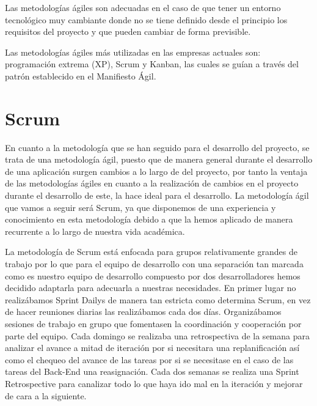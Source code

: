 Las metodologías ágiles son adecuadas en el caso de que tener un entorno tecnológico muy cambiante donde no se tiene definido desde el principio los requisitos del proyecto y que pueden cambiar de forma previsible.

Las metodologías ágiles más utilizadas en las empresas actuales son: programación extrema (XP), Scrum y Kanban, las cuales se guían a través del patrón establecido en el Manifiesto Ágil.

\section{Scrum}

En cuanto a la metodología que se han seguido para el desarrollo del proyecto, se trata de una metodología ágil, puesto que de manera general durante el desarrollo de una aplicación surgen cambios a lo largo de del proyecto, por tanto la ventaja de las metodologías ágiles en cuanto a la realización de cambios en el proyecto durante el desarrollo de este, la hace ideal para el desarrollo. La metodología ágil que vamos a seguir será Scrum, ya que disponemos de una experiencia y conocimiento en esta metodología debido a que la hemos aplicado de manera recurrente a lo largo de nuestra vida académica.

La metodología de Scrum está enfocada para grupos relativamente grandes de trabajo por lo que para el equipo de desarrollo con una separación tan marcada como es nuestro equipo de desarrollo compuesto por dos desarrolladores hemos decidido adaptarla para adecuarla a nuestras necesidades. En primer lugar no realizábamos Sprint Dailys de manera tan estricta como determina Scrum, en vez de hacer reuniones diarias las realizábamos cada dos días. Organizábamos sesiones de trabajo en grupo que fomentasen la coordinación y cooperación por parte del equipo. Cada domingo se realizaba una retrospectiva de la semana para analizar el avance a mitad de iteración por si necesitara una replanificación así como el chequeo del avance de las tareas por si se necesitase en el caso de las tareas del Back-End una reasignación. Cada dos semanas se realiza una Sprint Retrospective para canalizar todo lo que haya ido mal en la iteración y mejorar de cara a la siguiente.  